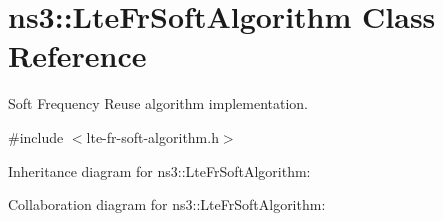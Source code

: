 \hypertarget{classns3_1_1LteFrSoftAlgorithm}{}\section{ns3\+:\+:Lte\+Fr\+Soft\+Algorithm Class Reference}
\label{classns3_1_1LteFrSoftAlgorithm}


Soft Frequency Reuse algorithm implementation.  




{\ttfamily \#include $<$lte-\/fr-\/soft-\/algorithm.\+h$>$}



Inheritance diagram for ns3\+:\+:Lte\+Fr\+Soft\+Algorithm\+:


Collaboration diagram for ns3\+:\+:Lte\+Fr\+Soft\+Algorithm\+:
